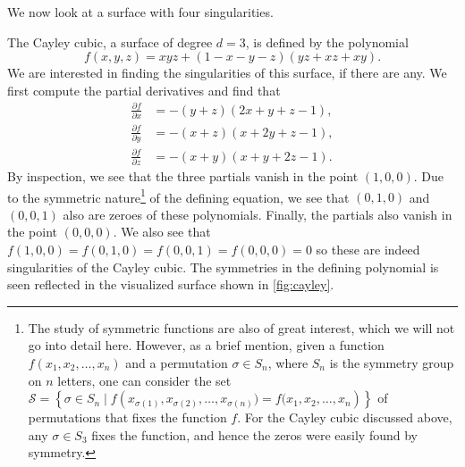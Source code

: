 \documentclass{article}
\begin{document}
    We now look at a surface with four singularities.
    \begin{example}
        The Cayley cubic, a surface of degree $d = 3$, is defined by the
        polynomial
        \begin{equation}
            f(x, y, z) = xyz + (1 - x - y - z)(yz + xz + xy).
        \end{equation}
        We are interested in finding the singularities of this surface, if there are any.
        We first compute the partial derivatives and find that
        \begin{align*}
            \frac{\partial f}{\partial x} &= -(y + z)(2x + y + z - 1), \\
            \frac{\partial f}{\partial y} &= -(x + z)(x + 2y + z - 1), \\
            \frac{\partial f}{\partial z} &= -(x + y)(x + y + 2z - 1).
        \end{align*}
        By inspection, we see that the three partials vanish in the point $(1,
        0, 0)$. Due to the symmetric nature\footnote{The study of symmetric
        functions are also of great interest, which
        we will not go into detail here. However, as a brief mention, given a
        function $f(x_1, x_2, \ldots, x_n)$ and a permutation $\sigma \in S_n$,
        where $S_n$ is the symmetry group on $n$ letters, one can consider the
        set $\mathcal{S} = \left\{ \sigma \in S_n \mid f\left(x_{\sigma(1)},
        x_{\sigma(2)}, \ldots, x_{\sigma(n)}) = f(x_1, x_2, \ldots,
        x_n\right)\right\}$ of permutations that fixes the function $f$. For
        the Cayley cubic discussed above, any $\sigma \in S_3$
        fixes the function, and hence the zeros were easily found by symmetry.} of the
        defining equation, we see that $(0, 1, 0)$ and $(0, 0, 1)$ also are zeroes of
        these polynomials.  Finally, the partials also vanish in the point $(0, 0, 0)$.
        We also see that $f(1, 0, 0) = f(0, 1, 0) = f(0, 0, 1) = f(0, 0, 0) = 0$ so
        these are indeed singularities of the Cayley cubic. The symmetries in the
        defining polynomial is seen reflected in the visualized surface shown in
        \cref{fig:cayley}.


\end{example}
\end{document}
